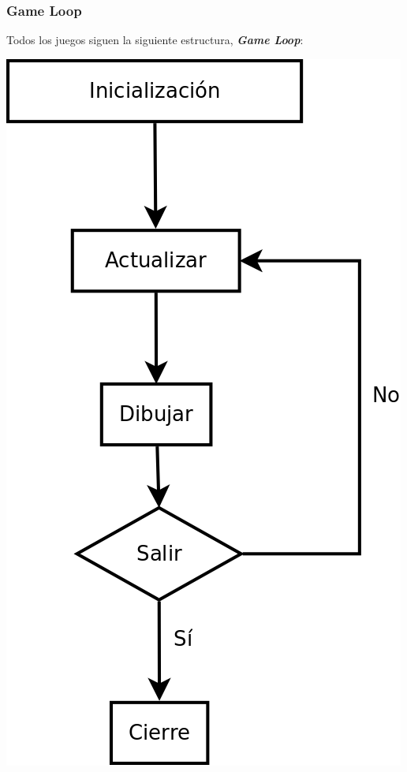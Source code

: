 \documentclass{beamer}
\begin{document}
\begin{frame}
	\frametitle{Game Loop}
	
	\begin{center}
		Todos los juegos siguen la siguiente estructura, \textbf{\emph{Game Loop}}:
	\end{center}	
	
	\begin{center}
		\includegraphics[scale=0.25]{img/gameloop.png}
	\end{center}	
\end{frame}
\end{document}

